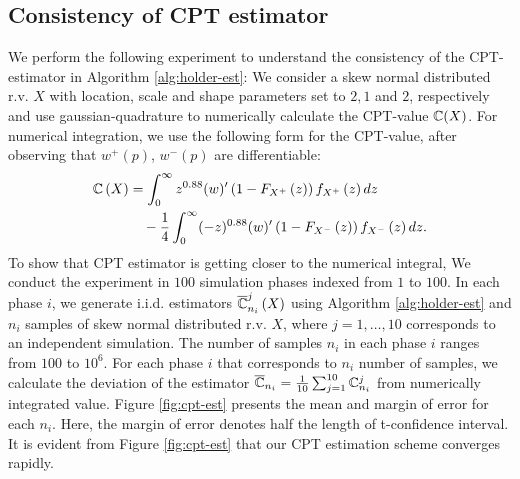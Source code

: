 \subsection{Consistency of CPT estimator}
We perform the following experiment to understand the consistency of the CPT-estimator in Algorithm \ref{alg:holder-est}:
We consider a skew normal distributed  r.v. $X$ with location, scale and shape parameters set to $2,1$ and $2$, respectively and use 
gaussian-quadrature to numerically calculate the CPT-value $\mathbb{C}(X)$. 
For numerical integration, we use the following form for the CPT-value, after observing that $w^+(p)$, $w^-(p)$ are differentiable:
\begin{align*}
\mathbb{C}\left( X \right) & = \int_0^{\infty} z^{0.88} (w)^\prime \left(1 - F_{X^+}\left(z\right)\right) f_{X^+}\left(z\right)dz \\
&\quad - \frac1{4} \int_0^{\infty} (-z)^{0.88} (w)^\prime \left(1 - F_{X^-}\left(z\right)\right) f_{X^-}\left(z\right) dz.
\end{align*}
To show that CPT estimator is getting closer to the numerical integral, 
We conduct the experiment in $100$ simulation phases indexed from $1$ to $100$. In each phase $i$, we generate i.i.d. estimators $\overline{\mathbb{C}}^j_{n_i}\left(X\right)$ using Algorithm \ref{alg:holder-est} and $n_i$ samples of skew normal distributed r.v. $X$, where $j=1,\ldots,10$ corresponds to an independent simulation. The number of samples $n_i$ in each phase $i$ ranges from $100$ to $10^6$. For each phase $i$ that corresponds to $n_i$ number of samples, we calculate the deviation of the estimator $\overline {\mathbb{C}}_{n_i} = \frac1{10}\sum_{j=1}^{10}\mathbb{C}^j_{n_i}$ from numerically integrated value. Figure \ref{fig:cpt-est} presents the mean and margin of error for each $n_i$. Here, the margin of error denotes half the length of t-confidence interval. It is evident from Figure \ref{fig:cpt-est} that our CPT estimation scheme converges rapidly.

\newcommand{\errorband}[5][]{ %
\pgfplotstableread[col sep=tab, skip first n=2]{#2}\datatable
    \addplot [draw=none, stack plots=y, forget plot] table [
        x={#3},
        y expr=\thisrow{#4}-2*\thisrow{#5}
    ] {\datatable};

    \addplot [draw=none, fill=gray!40, stack plots=y, area legend, #1] table [
        x={#3},
        y expr=4*\thisrow{#5}
    ] {\datatable} \closedcycle;

    \addplot [forget plot, stack plots=y,draw=none] table [x={#3}, y expr=-(\thisrow{#4}+2*\thisrow{#5})] {\datatable};
}

